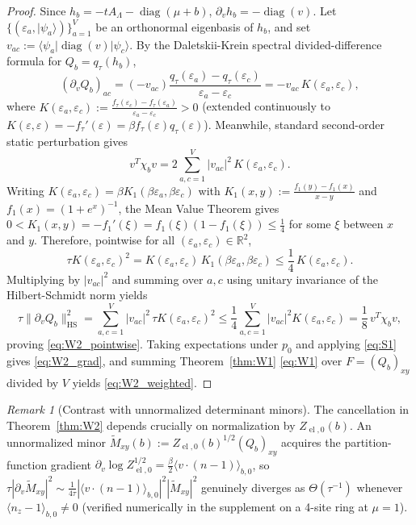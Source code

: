 \documentclass[11pt]{article}
\theoremstyle{definition}
\theoremstyle{remark}
\newtheorem{remark}[theorem]{Remark}
\DeclareMathOperator{\diag}{diag}
\DeclareMathOperator{\HS}{HS}
\DeclareMathOperator{\el}{el}
\newcommand{\R}{\mathbb{R}}
\begin{document}
\begin{proof}
Since $h_b = -tA_\Lambda - \diag(\mu + b)$, $\partial_v h_b = -\diag(v)$. Let $\{(\varepsilon_a, |\psi_a\rangle)\}_{a=1}^V$ be an orthonormal eigenbasis of $h_b$, and set $v_{ac} := \langle \psi_a | \diag(v) | \psi_c \rangle$. By the Daletskii-Krein spectral divided-difference formula \cite{daletskii1965} for $Q_b = q_\tau(h_b)$,
\[
(\partial_v Q_b)_{ac} = (-v_{ac}) \frac{q_\tau(\varepsilon_a) - q_\tau(\varepsilon_c)}{\varepsilon_a - \varepsilon_c} = -v_{ac}\, K(\varepsilon_a, \varepsilon_c),
\]
where $K(\varepsilon_a, \varepsilon_c) := \frac{f_\tau(\varepsilon_c) - f_\tau(\varepsilon_a)}{\varepsilon_a - \varepsilon_c} > 0$ (extended continuously to $K(\varepsilon, \varepsilon) = -f_\tau'(\varepsilon) = \beta f_\tau(\varepsilon) q_\tau(\varepsilon)$). Meanwhile, standard second-order static perturbation gives
\begin{equation}
v^T \chi_b v = 2 \sum_{a,c=1}^V |v_{ac}|^2\, K(\varepsilon_a, \varepsilon_c).
\label{eq:chi_spectral}
\end{equation}
Writing $K(\varepsilon_a, \varepsilon_c) = \beta K_1(\beta\varepsilon_a, \beta\varepsilon_c)$ with $K_1(x,y) := \frac{f_1(y) - f_1(x)}{x - y}$ and $f_1(x) = (1+e^x)^{-1}$, the Mean Value Theorem gives $0 < K_1(x,y) = -f_1'(\xi) = f_1(\xi)(1-f_1(\xi)) \le \frac{1}{4}$ for some $\xi$ between $x$ and $y$. Therefore, pointwise for all $(\varepsilon_a, \varepsilon_c) \in \R^2$,
\[
\tau K(\varepsilon_a, \varepsilon_c)^2 = K(\varepsilon_a, \varepsilon_c)\, K_1(\beta\varepsilon_a, \beta\varepsilon_c) \le \frac{1}{4}\, K(\varepsilon_a, \varepsilon_c).
\]
Multiplying by $|v_{ac}|^2$ and summing over $a, c$ using unitary invariance of the Hilbert-Schmidt norm yields
\[
\tau \|\partial_v Q_b\|_{\HS}^2 = \sum_{a,c=1}^V |v_{ac}|^2\, \tau K(\varepsilon_a, \varepsilon_c)^2 \le \frac{1}{4}\sum_{a,c=1}^V |v_{ac}|^2 K(\varepsilon_a, \varepsilon_c) = \frac{1}{8}\, v^T \chi_b v,
\]
proving \eqref{eq:W2_pointwise}. Taking expectations under $p_0$ and applying \eqref{eq:S1} gives \eqref{eq:W2_grad}, and summing Theorem~\ref{thm:W1} \eqref{eq:W1} over $F = (Q_b)_{xy}$ divided by $V$ yields \eqref{eq:W2_weighted}.
\end{proof}

\begin{remark}[Contrast with unnormalized determinant minors]
\label{rem:unnorm}
The cancellation in Theorem~\ref{thm:W2} depends crucially on normalization by $Z_{\el,0}(b)$. An unnormalized minor $\widetilde{M}_{xy}(b) := Z_{\el,0}(b)^{1/2} (Q_b)_{xy}$ acquires the partition-function gradient $\partial_v \log Z_{\el,0}^{1/2} = \frac{\beta}{2} \langle v\cdot(n - 1)\rangle_{b,0}$, so $\tau |\partial_v \widetilde{M}_{xy}|^2 \sim \frac{1}{4\tau} |\langle v\cdot(n-1)\rangle_{b,0}|^2 |\widetilde{M}_{xy}|^2$ genuinely diverges as $\Theta(\tau^{-1})$ whenever $\langle n_z - 1\rangle_{b,0} \neq 0$ (verified numerically in the supplement on a 4-site ring at $\mu = 1$).
\end{remark}
\end{document}
